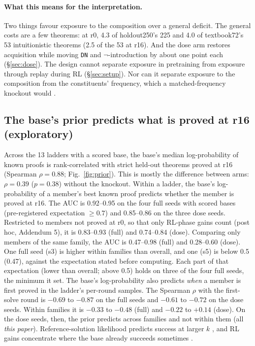 \paragraph{What this means for the interpretation.} Two things favour exposure to the composition over a general
deficit. The general costs are a few theorems: at r0, 4.3 of holdout250's 225 and 4.0 of textbook72's 53 intuitionistic
theorems (2.5 of the 53 at r16). And the dose arm restores acquisition while moving
\texttt{DN} and $\neg$-introduction by about one point each (\S\ref{sec:dose}). The design cannot separate exposure in
pretraining from exposure through replay during RL (\S\ref{sec:setup}). Nor can it separate exposure to the composition
from the constituents' frequency, which a matched-frequency knockout would \citep{abdulsalam2026rewrite,keysers2020cfq}.

\subsection{The base's prior predicts what is proved at r16 (exploratory)}
\label{sec:prior}

Across the 13 ladders with a scored base, the base's median log-probability of known \sig{} proofs is rank-correlated
with strict held-out theorems proved at r16 (Spearman $\rho = 0.88$; Fig.~\ref{fig:prior}). This is mostly the
difference between arms: $\rho = 0.39$ ($p = 0.38$) without the knockout. Within a ladder, the base's log-probability of
a member's best known proof predicts whether the member is proved at r16. The AUC is 0.92--0.95 on the four full seeds
with scored bases (pre-registered expectation $\geq 0.7$) and 0.85--0.86 on the three dose seeds. Restricted to members
not proved at r0, so that only RL-phase gains count (post hoc, Addendum 5), it is 0.83--0.93 (full) and 0.74--0.84
(dose). Comparing only members
of the same family, the AUC is 0.47--0.98 (full) and 0.28--0.60 (dose). One full seed (s3) is higher within families than
overall, and one (s5) is below 0.5 (0.47), against the expectation stated before computing. Each part of that
expectation (lower than overall; above 0.5) holds on three of the four full seeds, the minimum it set. The base's log-probability also predicts \emph{when} a member
is first proved in the ladder's per-round samples. The Spearman $\rho$ with the first-solve round is $-0.69$ to $-0.87$ on
the full seeds and $-0.61$ to $-0.72$ on the dose seeds. Within families it is $-0.33$ to $-0.48$ (full) and $-0.22$ to
$+0.14$ (dose). On the dose seeds, then, the prior predicts across families and not within them (all \emph{this paper}).
Reference-solution likelihood predicts success at larger $k$ \citep{schaeffer2025generative}, and RL gains concentrate
where the base already succeeds sometimes \citep{zhang2025interplay}.

